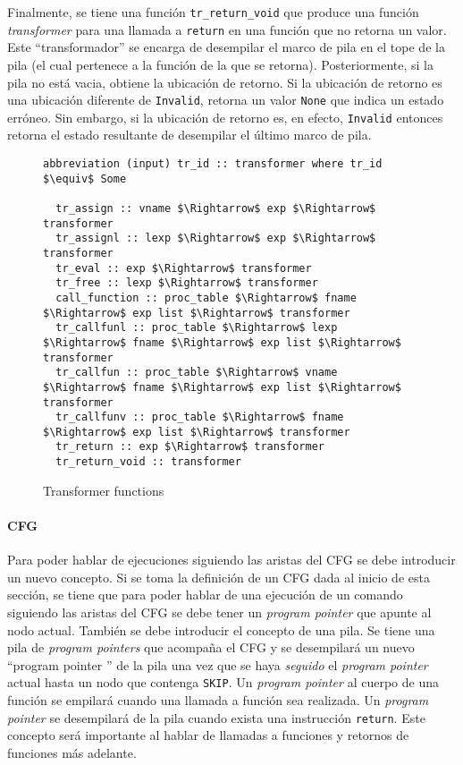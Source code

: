 Finalmente, se tiene una función \verb|tr_return_void| que produce una función \textit{transformer} para una llamada a \verb|return| en una función que no retorna un valor.
Este ``transformador'' se encarga de desempilar el marco de pila en el tope de la pila (el cual pertenece a la función de la que se retorna).
Posteriormente, si la pila no está vacia, obtiene la ubicación de retorno.
Si la ubicación de retorno es una ubicación diferente de \verb|Invalid|, retorna un valor \verb|None| que indica un estado erróneo.
Sin embargo, si la ubicación de retorno es, en efecto, \verb|Invalid| entonces retorna el estado resultante de desempilar el último marco de pila.

\begin{comment}
FIXME
\end{comment}

\begin{figure}
  \begin{lstlisting}[frame=single, mathescape=true]
  abbreviation (input) tr_id :: transformer where tr_id $\equiv$ Some

  tr_assign :: vname $\Rightarrow$ exp $\Rightarrow$ transformer
  tr_assignl :: lexp $\Rightarrow$ exp $\Rightarrow$ transformer
  tr_eval :: exp $\Rightarrow$ transformer
  tr_free :: lexp $\Rightarrow$ transformer
  call_function :: proc_table $\Rightarrow$ fname $\Rightarrow$ exp list $\Rightarrow$ transformer
  tr_callfunl :: proc_table $\Rightarrow$ lexp $\Rightarrow$ fname $\Rightarrow$ exp list $\Rightarrow$ transformer
  tr_callfun :: proc_table $\Rightarrow$ vname $\Rightarrow$ fname $\Rightarrow$ exp list $\Rightarrow$ transformer
  tr_callfunv :: proc_table $\Rightarrow$ fname $\Rightarrow$ exp list $\Rightarrow$ transformer
  tr_return :: exp $\Rightarrow$ transformer
  tr_return_void :: transformer
  \end{lstlisting}

  \caption{Transformer functions}
  \label{fig:transformer_def}
\end{figure}


\paragraph*{CFG}

Para poder hablar de ejecuciones siguiendo las aristas del CFG se debe introducir un nuevo concepto.
Si se toma la definición de un CFG dada al inicio de esta sección, se tiene que para poder hablar de una ejecución de un comando siguiendo las aristas del CFG se debe tener un \textit{program pointer} que apunte al nodo actual.
También se debe introducir el concepto de una pila.
Se tiene una pila de \textit{program pointers} que acompaña el CFG y se desempilará un nuevo ``program pointer '' de la pila una vez que se haya \textit{seguido} el \textit{program pointer} actual hasta un nodo que contenga \verb|SKIP|.
Un \textit{program pointer} al cuerpo de una función se empilará cuando una llamada a función sea realizada.
Un \textit{program pointer} se desempilará de la pila cuando exista una instrucción \verb|return|.
Este concepto será importante al hablar de llamadas a funciones y retornos de funciones más adelante.

